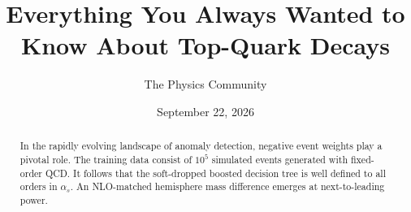 \documentclass[11pt]{article}
\title{Everything You Always Wanted to Know About Top-Quark Decays}
\author{The Physics Community}
\date{September 22, 2026}
\begin{document}
\maketitle
\begin{abstract}
In the rapidly evolving landscape of anomaly detection, negative event
weights play a pivotal role. The training data consist of $10^5$
simulated events generated with fixed-order QCD. It follows that the
soft-dropped boosted decision tree is well defined to all orders in
$\alpha_s$. An NLO-matched hemisphere mass difference emerges at
next-to-leading power.
\end{abstract}
\tableofcontents



\nocite{*}


\end{document}
